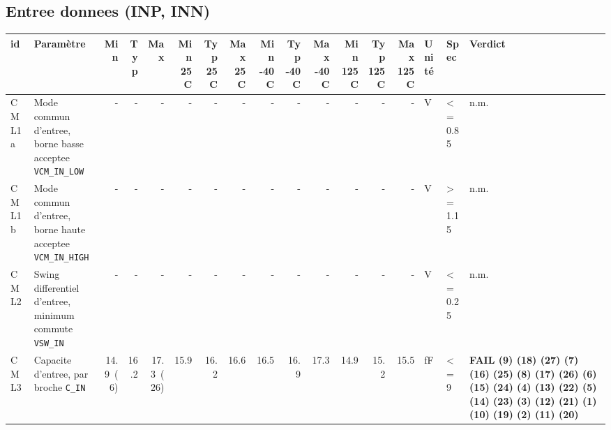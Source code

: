 \documentclass[a4paper,10pt,landscape]{article}
\begin{document}
\subsection*{Entree donnees (INP, INN)}
{\footnotesize\setlength{\tabcolsep}{3pt}\begin{longtable}{lp{46mm}rrrrrrrrrrrrlp{24mm}p{19mm}}\toprule
id & Param\`etre & Min & Typ & Max & {\tiny Min 25 C} & {\tiny Typ 25 C} & {\tiny Max 25 C} & {\tiny Min -40 C} & {\tiny Typ -40 C} & {\tiny Max -40 C} & {\tiny Min 125 C} & {\tiny Typ 125 C} & {\tiny Max 125 C} & Unit\'e & Spec & Verdict \\ \midrule\endhead
CML1a & Mode commun d'entree, borne basse acceptee {\tiny\texttt{VCM\_IN\_LOW}} & - & - & - & - & - & - & - & - & - & - & - & - & V & \textless{}= 0.85 & n.m. \\
CML1b & Mode commun d'entree, borne haute acceptee {\tiny\texttt{VCM\_IN\_HIGH}} & - & - & - & - & - & - & - & - & - & - & - & - & V & \textgreater{}= 1.15 & n.m. \\
CML2 & Swing differentiel d'entree, minimum commute {\tiny\texttt{VSW\_IN}} & - & - & - & - & - & - & - & - & - & - & - & - & V & \textless{}= 0.25 & n.m. \\
CML3 & Capacite d'entree, par broche {\tiny\texttt{C\_IN}} & 14.9~(6) & 16.2 & 17.3~(26) & 15.9 & 16.2 & 16.6 & 16.5 & 16.9 & 17.3 & 14.9 & 15.2 & 15.5 & fF & \textless{}= 9 & \textbf{FAIL (9) (18) (27) (7) (16) (25) (8) (17) (26) (6) (15) (24) (4) (13) (22) (5) (14) (23) (3) (12) (21) (1) (10) (19) (2) (11) (20)} \\
\bottomrule\end{longtable}}
\end{document}
